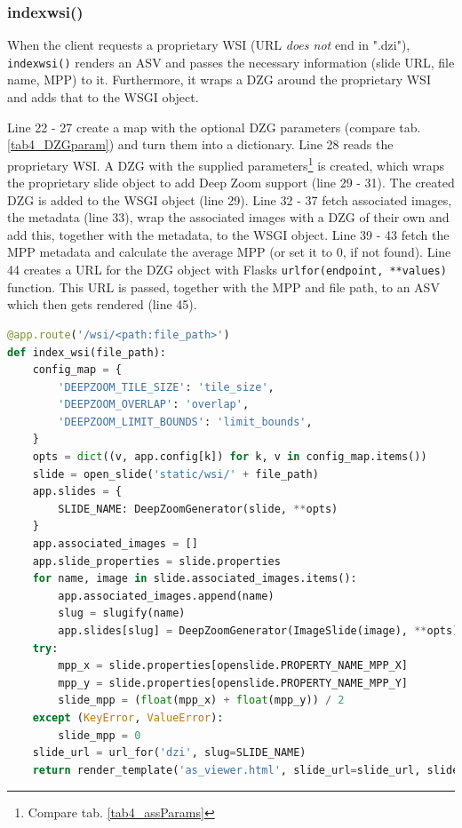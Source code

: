 \subsubsection{index{\textunderscore}wsi()}
When the client requests a proprietary WSI (URL \emph{does not} end in ".dzi"), \texttt{index{\textunderscore}wsi()} renders an ASV and passes the necessary information (slide URL, file name, MPP) to it. Furthermore, it wraps a DZG around the proprietary WSI and adds that to the WSGI object.

Line 22 - 27 create a map with the optional DZG parameters (compare tab. \ref{tab4_DZGparam}) and turn them into a dictionary. Line 28 reads the proprietary WSI. A DZG with the supplied parameters\footnote{Compare tab. \ref{tab4_assParams}} is created, which wraps the proprietary slide object to add Deep Zoom support (line 29 - 31). The created DZG is added to the WSGI object (line 29). Line 32 - 37 fetch associated images, the metadata (line 33), wrap the associated images with a DZG of their own and add this, together with the metadata, to the WSGI object. Line 39 - 43 fetch the MPP metadata and calculate the average MPP (or set it to 0, if not found). 
Line 44 creates a URL for the DZG object with Flasks \texttt{url{\textunderscore}for(endpoint, **values)} function. This URL is passed, together with the MPP and file path, to an ASV which then gets rendered (line 45).

\begin{lstlisting}[language=Python, frame=single]
@app.route('/wsi/<path:file_path>')
def index_wsi(file_path):
	config_map = {
		'DEEPZOOM_TILE_SIZE': 'tile_size',
		'DEEPZOOM_OVERLAP': 'overlap',
		'DEEPZOOM_LIMIT_BOUNDS': 'limit_bounds',
	}
	opts = dict((v, app.config[k]) for k, v in config_map.items())
	slide = open_slide('static/wsi/' + file_path)
	app.slides = {
		SLIDE_NAME: DeepZoomGenerator(slide, **opts)
	}
	app.associated_images = []
	app.slide_properties = slide.properties
	for name, image in slide.associated_images.items():
		app.associated_images.append(name)
		slug = slugify(name)
		app.slides[slug] = DeepZoomGenerator(ImageSlide(image), **opts)
	try:
		mpp_x = slide.properties[openslide.PROPERTY_NAME_MPP_X]
		mpp_y = slide.properties[openslide.PROPERTY_NAME_MPP_Y]
		slide_mpp = (float(mpp_x) + float(mpp_y)) / 2
	except (KeyError, ValueError):
		slide_mpp = 0
	slide_url = url_for('dzi', slug=SLIDE_NAME)
	return render_template('as_viewer.html', slide_url=slide_url, slide_mpp=slide_mpp, file_name=file_path)
\end{lstlisting}


